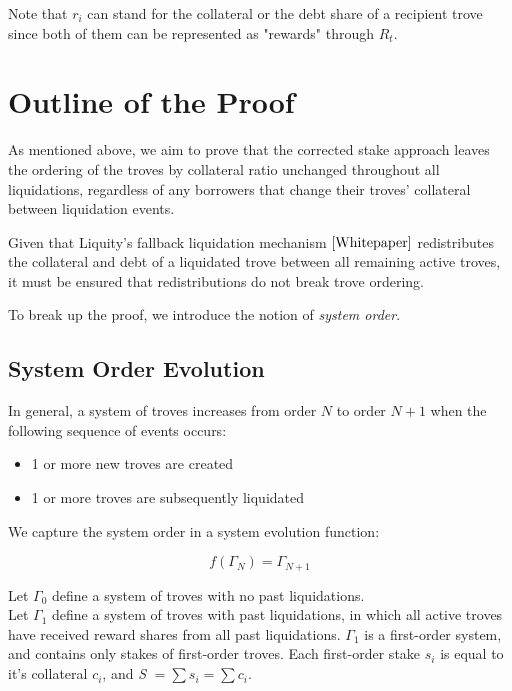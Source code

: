 \documentclass[reqno]{article}
\begin{document}
Note that $r_i$ can stand for the collateral or the debt share of a recipient trove since both of them can be represented as "rewards" through $R_t$.

\section{Outline of the Proof}
As mentioned above, we aim to prove that the corrected stake approach leaves the ordering of the troves by collateral ratio unchanged throughout all liquidations, regardless of any borrowers that change their troves' collateral between liquidation events.

Given that Liquity's fallback liquidation mechanism $\cite{Whitepaper}$ redistributes the collateral and debt of a liquidated trove between all remaining active troves, it must be  ensured that redistributions do not break trove ordering.

To break up the proof, we introduce the notion of \textit{system order}. 

\subsection{System Order Evolution}
In general, a system of troves increases from order $N$ to order $N+1$ when the following sequence of events occurs:

\begin{itemize}
  \item 1 or more new troves are created 
  \item 1 or more troves are subsequently liquidated
\end{itemize}

We capture the system order in a system evolution function:

\begin{equation} 
    f(\Gamma_N)=\Gamma_{N+1}
\end{equation}

\bigskip
Let $\Gamma_0$ define a system of troves with no past liquidations.\\

Let $\Gamma_1$ define a system of troves with past liquidations, in which all active troves have received reward shares from all past liquidations. $\Gamma_1$ is a first-order system, and contains only stakes of first-order troves. Each first-order stake $s_i$ is equal to it’s collateral $c_i$, and \textit{S} $= \sum s_i = \sum c_i$.\\
\end{document}
